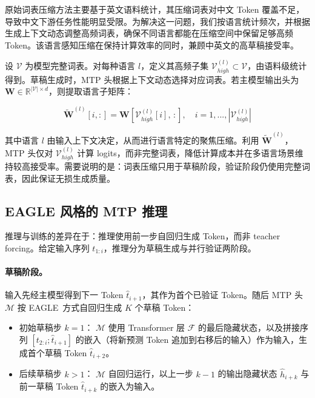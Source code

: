 \documentclass{article} %
\begin{document}
原始词表压缩方法主要基于英文语料统计，其压缩词表对中文 Token 覆盖不足，导致中文下游任务性能明显受限。为解决这一问题，我们按语言统计频次，并根据生成上下文动态调整高频词表，确保不同语言都能在压缩空间中保留足够高频 Token。该语言感知压缩在保持计算效率的同时，兼顾中英文的高草稿接受率。

设 $\mathcal{V}$ 为模型完整词表。对每种语言 $l$，定义其高频子集 $\mathcal{V}_{high}^{(l)} \subset \mathcal{V}$，由语料级统计得到。草稿生成时，MTP 头根据上下文动态选择对应词表。若主模型输出头为 $\mathbf{W}\in\mathbb{R}^{|\mathcal{V}|\times d}$，则提取语言子矩阵：

\begin{equation}
    \tilde{\mathbf{W}}^{(l)}[i,:]=\mathbf{W}[\mathcal{V}_{high}^{(l)}[i],\,:],\quad i=1, ...,|\mathcal{V}_{high}^{(l)}|
\end{equation}

其中语言 $l$ 由输入上下文决定，从而进行语言特定的聚焦压缩。利用 $\tilde{\mathbf{W}}^{(l)}$，MTP 头仅对 $\mathcal{V}_{high}^{(l)}$ 计算 logits，而非完整词表，降低计算成本并在多语言场景维持较高接受率。需要说明的是：词表压缩只用于草稿阶段，验证阶段仍使用完整词表，因此保证无损生成质量。


\subsection{EAGLE 风格的 MTP 推理}

推理与训练的差异在于：推理使用前一步自回归生成 Token，而非 teacher forcing。给定输入序列 $t_{1:i}$，推理分为草稿生成与并行验证两阶段。

\paragraph{草稿阶段。} 输入先经主模型得到下一 Token $\hat{t}_{i+1}$，其作为首个已验证 Token。随后 MTP 头 $\mathcal{M}$ 按 EAGLE~\citep{li2024eagle}方式自回归生成 $K$ 个草稿 Token：

\begin{itemize}
    \item 初始草稿步 $k=1$：
    $\mathcal{M}$ 使用 Transformer 层 $\mathcal{F}$ 的最后隐藏状态，以及拼接序列 $[t_{2:i}; \hat{t}_{i+1}]$ 的嵌入（将新预测 Token 追加到右移后的输入）作为输入，生成首个草稿 Token $\hat{t}_{i+2}$。

    \item 后续草稿步 $k>1$：
    $\mathcal{M}$ 自回归运行，以上一步 $k-1$ 的输出隐藏状态 $\hat{h}_{i+k}$ 与前一草稿 Token $\hat{t}_{i+k}$ 的嵌入为输入。
\end{itemize}
\end{document}
